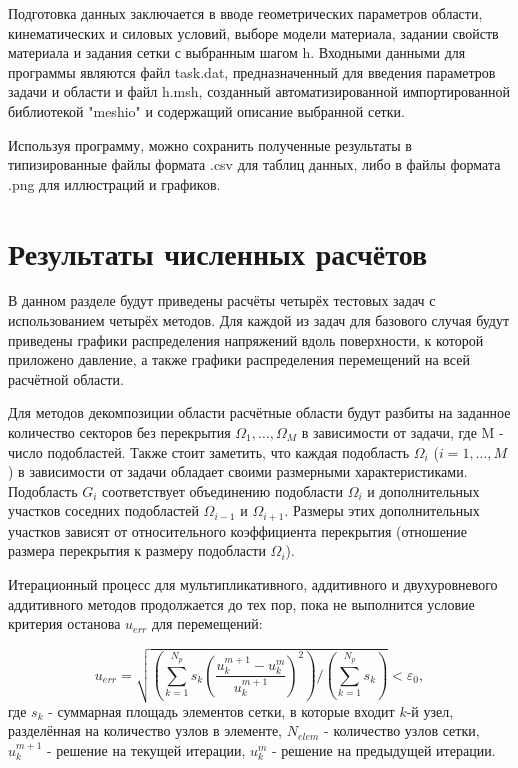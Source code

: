 \documentclass[a4paper, 14pt]{extarticle}
\begin{document}
\newpage

Подготовка данных заключается в вводе геометрических параметров области, кинематических и силовых условий, выборе модели материала, задании свойств материала и задания сетки с выбранным шагом h. Входными данными для программы являются файл {task}.dat, предназначенный для введения параметров задачи и области и файл {h}.msh, созданный автоматизированной импортированной библиотекой "meshio" и содержащий описание выбранной сетки.

Используя программу, можно сохранить полученные результаты в типизированные файлы формата .csv для таблиц данных, либо в файлы формата .png для иллюстраций и графиков.

\newpage

\section{Результаты численных расчётов}

В данном разделе будут приведены расчёты четырёх тестовых задач с использованием четырёх методов. Для каждой из задач для базового случая будут приведены графики распределения напряжений вдоль поверхности, к которой приложено давление, а также графики распределения перемещений на всей расчётной области.

Для методов декомпозиции области расчётные области будут разбиты на заданное количество секторов без перекрытия $\Omega_1, \ldots, \Omega_M$ в зависимости от задачи, где M - число подобластей. Также стоит заметить, что каждая подобласть $\Omega_i$ ($i = 1,\ldots,M$) в зависимости от задачи обладает своими размерными характеристиками. Подобласть $G_i$ соответствует объединению подобласти $\Omega_i$ и дополнительных участков соседних подобластей $\Omega_{i-1}$ и $\Omega_{i+1}$. Размеры этих дополнительных участков зависят от относительного коэффициента перекрытия (отношение размера перекрытия к размеру подобласти $\Omega_i$).

Итерационный процесс для мультипликативного, аддитивного и двухуровневого аддитивного методов продолжается до тех пор, пока не выполнится условие критерия останова $u_{err}$ для перемещений:

\begin{equation*}
u_{err} = \sqrt{\left(\sum_{k = 1}^{N_p} s_k \left(\frac{u_{k}^{m+1} - u_{k}^{m}}{u_{k}^{m+1}} \right)^2\right) / \left(\sum_{k = 1}^{N_{p}} s_k\right)} < \varepsilon_0,
\end{equation*}
где $s_k$ - суммарная площадь элементов сетки, в которые входит $k$-й узел, разделённая на количество узлов в элементе, $N_{elem}$ - количество узлов сетки, $u_{k}^{m+1}$ - решение на текущей итерации, $u_{k}^{m}$ - решение на предыдущей итерации.
\end{document}
